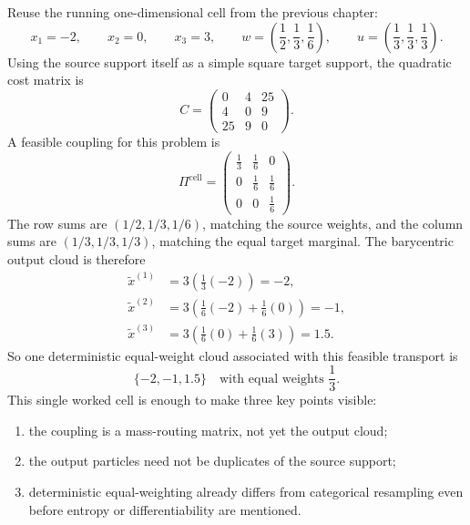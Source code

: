 Reuse the running one-dimensional cell from the previous chapter:
\[
  x_1=-2,
  \qquad x_2=0,
  \qquad x_3=3,
  \qquad
  w=
  \left(
    \frac{1}{2},
    \frac{1}{3},
    \frac{1}{6}
  \right),
  \qquad
  u=
  \left(
    \frac{1}{3},
    \frac{1}{3},
    \frac{1}{3}
  \right).
\]
Using the source support itself as a simple square target support, the quadratic
cost matrix is
\begin{equation}
\label{eq:bf-ot-baseline-cost}
  C
  =
  \begin{pmatrix}
    0 & 4 & 25 \\
    4 & 0 & 9 \\
    25 & 9 & 0
  \end{pmatrix}.
\end{equation}
A feasible coupling for this problem is
\begin{equation}
\label{eq:bf-ot-baseline-feasible-coupling}
  \Pi^{\mathrm{cell}}
  =
  \begin{pmatrix}
    \frac{1}{3} & \frac{1}{6} & 0 \\
    0 & \frac{1}{6} & \frac{1}{6} \\
    0 & 0 & \frac{1}{6}
  \end{pmatrix}.
\end{equation}
The row sums are
\((1/2,1/3,1/6)\), matching the source weights, and the column sums are
\((1/3,1/3,1/3)\), matching the equal target marginal.  The barycentric output
cloud is therefore
\begin{align}
\label{eq:bf-ot-baseline-cell-barycentric}
  \tilde x^{(1)} &= 3\left(\frac{1}{3}(-2)\right) = -2, \\
  \tilde x^{(2)} &= 3\left(\frac{1}{6}(-2)+\frac{1}{6}(0)\right) = -1, \\
  \tilde x^{(3)} &= 3\left(\frac{1}{6}(0)+\frac{1}{6}(3)\right) = 1.5.
\end{align}
So one deterministic equal-weight cloud associated with this feasible transport is
\[
  \{-2,-1,1.5\}
  \quad\text{with equal weights }\frac{1}{3}.
\]
This single worked cell is enough to make three key points visible:
\begin{enumerate}[label=(\roman*)]
  \item the coupling is a mass-routing matrix, not yet the output cloud;
  \item the output particles need not be duplicates of the source support;
  \item deterministic equal-weighting already differs from categorical resampling
  even before entropy or differentiability are mentioned.
\end{enumerate}

